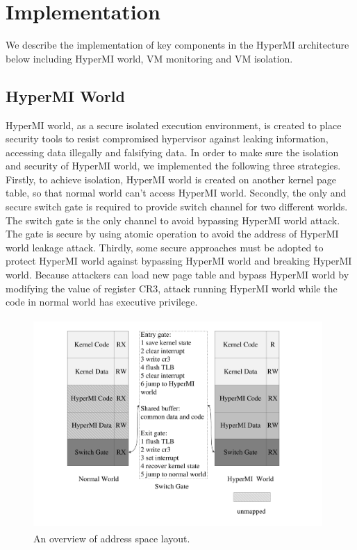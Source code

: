\documentclass[conference]{IEEEtran}
\begin{document}
\section{Implementation}

We describe the implementation of key components in the HyperMI architecture below including HyperMI world, VM monitoring and VM isolation.

\subsection{HyperMI World} \label {HWorld}
HyperMI world, as a secure isolated execution environment, is created to place security tools to resist compromised hypervisor against leaking information, accessing data illegally and falsifying data. 
In order to make sure the isolation and security of HyperMI world, we implemented the following three strategies.
Firstly, to achieve isolation, HyperMI world is created on another kernel page table, so that normal world can't access HyperMI world. Secondly, the only and secure switch gate is required to provide switch channel for two different worlds. The switch gate is the only channel to avoid bypassing HyperMI world attack. The gate is secure by using atomic operation to avoid the address of HyperMI world leakage attack. Thirdly, some secure approaches must be adopted to protect HyperMI world against bypassing HyperMI world and breaking HyperMI world. Because attackers can load new page table and bypass HyperMI world by modifying the value of register CR3, attack running HyperMI world while the code in normal world has executive privilege.

\begin{figure}
\centerline{\includegraphics[width=11cm, height=8cm]{pdfvmcs2.pdf}}%
\caption{An overview of address space layout.} \label{fig2}
\end{figure}
\end{document}
